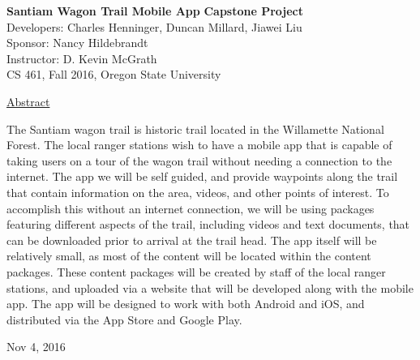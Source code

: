 \documentclass[letterpaper, 10pt,titlepage]{article}
\newcommand\tab[1][1cm]{\hspace*{#1}}
\begin{document}
\begin{titlepage}
\begin{center}
    \Huge
    \textbf{Santiam Wagon Trail Mobile App}
    \textbf{Capstone Project}\\
    \vspace{1.0cm}
    \large
    Developers: Charles Henninger, Duncan Millard, Jiawei Liu\\
    Sponsor: Nancy Hildebrandt\\
    \vspace{1.5cm}
    \large
    Instructor: D. Kevin McGrath\\

    \large
    CS 461, Fall 2016, Oregon State University\\    

    \vspace{3.2cm}

    \large
    \underline{Abstract}\\
    \vspace{0.3cm}
    \end{center}
    \large

    \tab The Santiam wagon trail is historic trail located in the Willamette National Forest. The local ranger stations wish to have a mobile app that is capable of taking users on a tour of the wagon trail without needing a connection to the internet. The app we will be self guided, and provide waypoints along the trail that contain information on the area, videos, and other points of interest. To accomplish this without an internet connection, we will be using packages featuring different aspects of the trail, including videos and text documents, that can be downloaded prior to arrival at the trail head. The app itself will be relatively small, as most of the content will be located within the content packages.  These content packages will be created by staff of the local ranger stations, and uploaded via a website that will be developed along with the mobile app. The app will be designed to work with both Android and iOS, and distributed via the App Store and Google Play.
    
    \vspace{0.8cm}
    \vfill
    
\begin{center}    
    Nov 4, 2016

\end{center}
\end{titlepage}


\tableofcontents
\newpage
\end{document}
